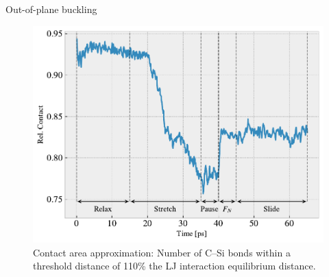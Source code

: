 \documentclass[
	10pt, %
]{beamer}
\begin{document}
%
%
\begin{frame}{Out-of-plane buckling}
	\begin{figure}
		\includegraphics[height=0.7\textheight]{figures/contact_pct.pdf}
		\caption{Contact area approximation: Number of C--Si bonds within a threshold distance of 110\% the LJ interaction equilibrium distance.}
	\end{figure}	
\end{frame}
\end{document}
